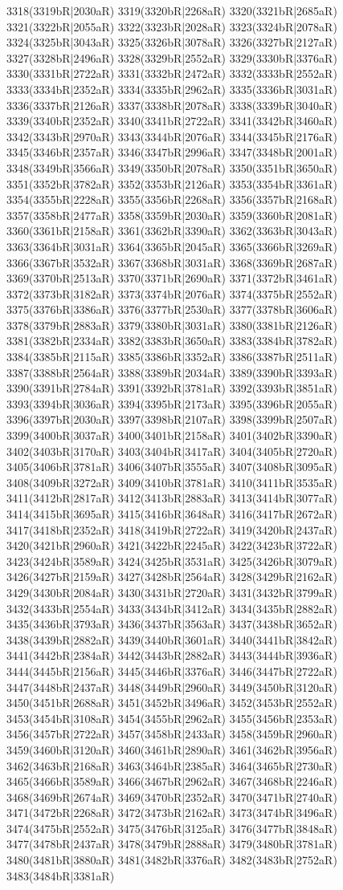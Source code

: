 3318(3319bR|2030aR) 3319(3320bR|2268aR) 3320(3321bR|2685aR) 3321(3322bR|2055aR) 3322(3323bR|2028aR) 3323(3324bR|2078aR) 3324(3325bR|3043aR) 3325(3326bR|3078aR) 3326(3327bR|2127aR) 3327(3328bR|2496aR) 3328(3329bR|2552aR) 3329(3330bR|3376aR) 3330(3331bR|2722aR) 3331(3332bR|2472aR) 3332(3333bR|2552aR) 3333(3334bR|2352aR) 3334(3335bR|2962aR) 3335(3336bR|3031aR) 3336(3337bR|2126aR) 3337(3338bR|2078aR) 3338(3339bR|3040aR) 3339(3340bR|2352aR) 3340(3341bR|2722aR) 3341(3342bR|3460aR) 3342(3343bR|2970aR) 3343(3344bR|2076aR) 3344(3345bR|2176aR) 3345(3346bR|2357aR) 3346(3347bR|2996aR) 3347(3348bR|2001aR) 3348(3349bR|3566aR) 3349(3350bR|2078aR) 3350(3351bR|3650aR) 3351(3352bR|3782aR) 3352(3353bR|2126aR) 3353(3354bR|3361aR) 3354(3355bR|2228aR) 3355(3356bR|2268aR) 3356(3357bR|2168aR) 3357(3358bR|2477aR) 3358(3359bR|2030aR) 3359(3360bR|2081aR) 3360(3361bR|2158aR) 3361(3362bR|3390aR) 3362(3363bR|3043aR) 3363(3364bR|3031aR) 3364(3365bR|2045aR) 3365(3366bR|3269aR) 3366(3367bR|3532aR) 3367(3368bR|3031aR) 3368(3369bR|2687aR) 3369(3370bR|2513aR) 3370(3371bR|2690aR) 3371(3372bR|3461aR) 3372(3373bR|3182aR) 3373(3374bR|2076aR) 3374(3375bR|2552aR) 3375(3376bR|3386aR) 3376(3377bR|2530aR) 3377(3378bR|3606aR) 3378(3379bR|2883aR) 3379(3380bR|3031aR) 3380(3381bR|2126aR) 3381(3382bR|2334aR) 3382(3383bR|3650aR) 3383(3384bR|3782aR) 3384(3385bR|2115aR) 3385(3386bR|3352aR) 3386(3387bR|2511aR) 3387(3388bR|2564aR) 3388(3389bR|2034aR) 3389(3390bR|3393aR) 3390(3391bR|2784aR) 3391(3392bR|3781aR) 3392(3393bR|3851aR) 3393(3394bR|3036aR) 3394(3395bR|2173aR) 3395(3396bR|2055aR) 3396(3397bR|2030aR) 3397(3398bR|2107aR) 3398(3399bR|2507aR) 3399(3400bR|3037aR) 3400(3401bR|2158aR) 3401(3402bR|3390aR) 3402(3403bR|3170aR) 3403(3404bR|3417aR) 3404(3405bR|2720aR) 3405(3406bR|3781aR) 3406(3407bR|3555aR) 3407(3408bR|3095aR) 3408(3409bR|3272aR) 3409(3410bR|3781aR) 3410(3411bR|3535aR) 3411(3412bR|2817aR) 3412(3413bR|2883aR) 3413(3414bR|3077aR) 3414(3415bR|3695aR) 3415(3416bR|3648aR) 3416(3417bR|2672aR) 3417(3418bR|2352aR) 3418(3419bR|2722aR) 3419(3420bR|2437aR) 3420(3421bR|2960aR) 3421(3422bR|2245aR) 3422(3423bR|3722aR) 3423(3424bR|3589aR) 3424(3425bR|3531aR) 3425(3426bR|3079aR) 3426(3427bR|2159aR) 3427(3428bR|2564aR) 3428(3429bR|2162aR) 3429(3430bR|2084aR) 3430(3431bR|2720aR) 3431(3432bR|3799aR) 3432(3433bR|2554aR) 3433(3434bR|3412aR) 3434(3435bR|2882aR) 3435(3436bR|3793aR) 3436(3437bR|3563aR) 3437(3438bR|3652aR) 3438(3439bR|2882aR) 3439(3440bR|3601aR) 3440(3441bR|3842aR) 3441(3442bR|2384aR) 3442(3443bR|2882aR) 3443(3444bR|3936aR) 3444(3445bR|2156aR) 3445(3446bR|3376aR) 3446(3447bR|2722aR) 3447(3448bR|2437aR) 3448(3449bR|2960aR) 3449(3450bR|3120aR) 3450(3451bR|2688aR) 3451(3452bR|3496aR) 3452(3453bR|2552aR) 3453(3454bR|3108aR) 3454(3455bR|2962aR) 3455(3456bR|2353aR) 3456(3457bR|2722aR) 3457(3458bR|2433aR) 3458(3459bR|2960aR) 3459(3460bR|3120aR) 3460(3461bR|2890aR) 3461(3462bR|3956aR) 3462(3463bR|2168aR) 3463(3464bR|2385aR) 3464(3465bR|2730aR) 3465(3466bR|3589aR) 3466(3467bR|2962aR) 3467(3468bR|2246aR) 3468(3469bR|2674aR) 3469(3470bR|2352aR) 3470(3471bR|2740aR) 3471(3472bR|2268aR) 3472(3473bR|2162aR) 3473(3474bR|3496aR) 3474(3475bR|2552aR) 3475(3476bR|3125aR) 3476(3477bR|3848aR) 3477(3478bR|2437aR) 3478(3479bR|2888aR) 3479(3480bR|3781aR) 3480(3481bR|3880aR) 3481(3482bR|3376aR) 3482(3483bR|2752aR) 3483(3484bR|3381aR) 